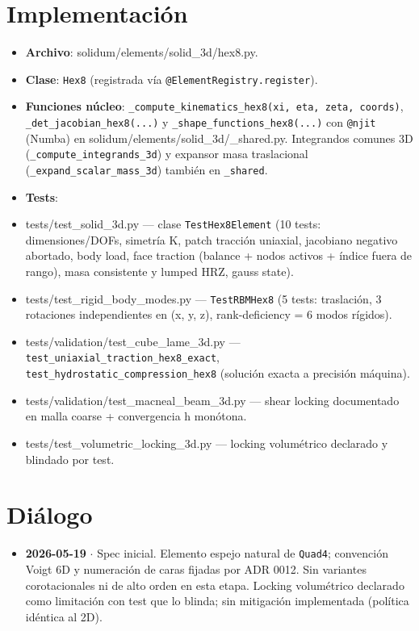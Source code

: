 \documentclass[11pt,letterpaper,oneside]{report}
\begin{document}
\section{Implementación}

\begin{itemize}
  \item \textbf{Archivo}: solidum/elements/solid\_3d/hex8.py.
  \item \textbf{Clase}: \texttt{Hex8} (registrada vía \texttt{@ElementRegistry.register}).
  \item \textbf{Funciones núcleo}: \texttt{\_compute\_kinematics\_hex8(xi, eta, zeta, coords)}, \texttt{\_det\_jacobian\_hex8(...)} y \texttt{\_shape\_functions\_hex8(...)} con \texttt{@njit} (Numba) en solidum/elements/solid\_3d/\_shared.py. Integrandos comunes 3D (\texttt{\_compute\_integrands\_3d}) y expansor masa traslacional (\texttt{\_expand\_scalar\_mass\_3d}) también en \texttt{\_shared}.
  \item \textbf{Tests}:
  \item tests/test\_solid\_3d.py --- clase \texttt{TestHex8Element} (10 tests: dimensiones/DOFs, simetría K, patch tracción uniaxial, jacobiano negativo abortado, body load, face traction (balance + nodos activos + índice fuera de rango), masa consistente y lumped HRZ, gauss state).
  \item tests/test\_rigid\_body\_modes.py --- \texttt{TestRBMHex8} (5 tests: traslación, 3 rotaciones independientes en (x, y, z), rank-deficiency = 6 modos rígidos).
  \item tests/validation/test\_cube\_lame\_3d.py --- \texttt{test\_uniaxial\_traction\_hex8\_exact}, \texttt{test\_hydrostatic\_compression\_hex8} (solución exacta a precisión máquina).
  \item tests/validation/test\_macneal\_beam\_3d.py --- shear locking documentado en malla coarse + convergencia h monótona.
  \item tests/test\_volumetric\_locking\_3d.py --- locking volumétrico declarado y blindado por test.
\end{itemize}


\section{Diálogo}

\begin{itemize}
  \item \textbf{2026-05-19} \ensuremath{\cdot} Spec inicial. Elemento espejo natural de \texttt{Quad4}; convención Voigt 6D y numeración de caras fijadas por ADR 0012. Sin variantes corotacionales ni de alto orden en esta etapa. Locking volumétrico declarado como limitación con test que lo blinda; sin mitigación implementada (política idéntica al 2D).
\end{itemize}
\end{document}

